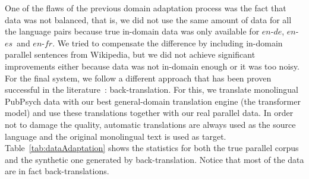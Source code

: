 \documentclass[a4paper,11pt]{article}
\newcommand{\en}{$en$}
\newcommand{\es}{$es$}
\newcommand{\fr}{$fr$}
\newcommand{\de}{$de$}
\begin{document}
One of the flaws of the previous domain adaptation process was the fact that data was not balanced, that is, we did not use the same amount of data for all the language pairs because true in-domain data was only available for \en-\de, \en-\es\ and \en-\fr. We tried to compensate the difference by including in-domain parallel sentences from Wikipedia, but we did not achieve significant improvements either because data was not in-domain enough or it was too noisy. For the final system, we follow a different approach that has been proven successful in the literature~\cite{sennrichEtal:2016}: back-translation. For this, we translate monolingual PubPsych data with our best general-domain translation engine (the transformer model) and use these translations together with our real parallel data. In order not to damage the quality, automatic translations are always used as the source language and the original monolingual text is used as target. Table~\ref{tab:dataAdaptation} shows the statistics for both the true parallel corpus and the synthetic one generated by back-translation. Notice that most of the data are in fact back-translations.
\end{document}
